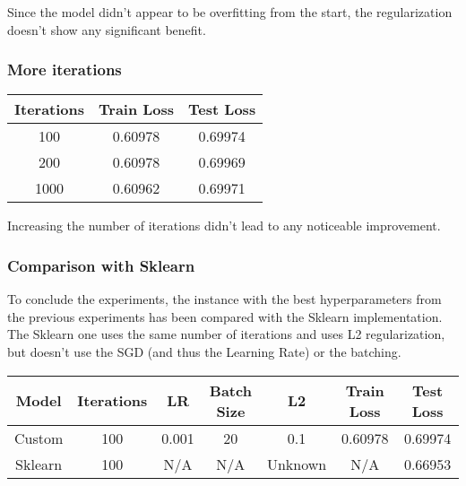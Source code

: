 \documentclass[
	letterpaper, %
	10pt, %
]{class}
\begin{document}
Since the model didn't appear to be overfitting from the start, the regularization doesn't show any significant benefit.

\subsubsection{More iterations}

\begin{center}
	\begin{tabular}{ |c|c|c| }
		\hline
		Iterations & Train Loss & Test Loss \\
		\hline
		100        & 0.60978    & 0.69974   \\
		200        & 0.60978    & 0.69969   \\
		1000       & 0.60962    & 0.69971   \\
		\hline
	\end{tabular}
\end{center}

Increasing the number of iterations didn't lead to any noticeable improvement.

\subsubsection{Comparison with Sklearn}

To conclude the experiments, the instance with the best hyperparameters from the previous experiments has been compared with the Sklearn implementation.\\

The Sklearn one uses the same number of iterations and uses L2 regularization, but doesn't use the SGD (and thus the Learning Rate) or the batching.

\begin{center}
	\begin{tabular}{ |c|c|c|c|c|c|c| }
		\hline
		Model   & Iterations & LR    & Batch Size & L2      & Train Loss & Test Loss \\
		\hline
		Custom  & 100        & 0.001 & 20         & 0.1     & 0.60978    & 0.69974   \\
		Sklearn & 100        & N/A   & N/A        & Unknown & N/A        & 0.66953   \\
		\hline
	\end{tabular}
\end{center}
\end{document}
